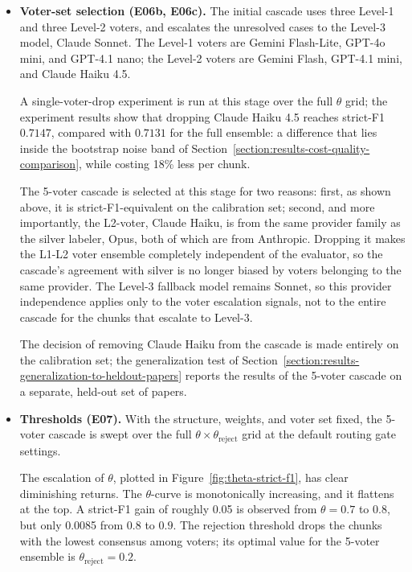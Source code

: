 \begin{itemize}[label={},leftmargin=1.5em]
    \item \textbf{Voter-set selection (E06b, E06c).}
    The initial cascade uses three Level-1 and three Level-2 voters, and escalates the unresolved cases to the Level-3 model, Claude Sonnet. The 
    Level-1 voters are Gemini Flash-Lite, GPT-4o mini, and GPT-4.1 nano; the Level-2 voters are Gemini Flash, GPT-4.1 mini, and Claude Haiku 4.5.
    
    A single-voter-drop experiment is run at this stage over the full $\theta$ grid; the experiment results show that dropping Claude Haiku 4.5 reaches strict-F1 $0.7147$, compared with $0.7131$ for the full ensemble: a difference that lies inside the bootstrap noise band of Section~\ref{section:results-cost-quality-comparison}, while costing 18\% less per chunk.
    
    The 5-voter cascade is selected at this stage for two reasons: first, as shown above, it is strict-F1-equivalent on the calibration set; second, and more importantly, the L2-voter, Claude Haiku, is from the same provider family as the silver labeler, Opus, both of which are from Anthropic. Dropping it makes the L1-L2 voter ensemble completely independent of the evaluator, so the cascade's agreement with silver is no longer biased by voters belonging to the same provider. The Level-3 fallback model remains Sonnet, so this provider independence applies only to the voter escalation signals, not to the entire cascade for the chunks that escalate to Level-3. 
    
    The decision of removing Claude Haiku from the cascade is made entirely on the calibration set; the generalization test of Section~\ref{section:results-generalization-to-heldout-papers} reports the results of the 5-voter cascade on a separate, held-out set of papers.
    
    \item \textbf{Thresholds (E07).}
    With the structure, weights, and voter set fixed, the 5-voter cascade is swept over the full $\theta \times \theta_{\mathrm{reject}}$ grid at the default routing gate settings. 
    
    The escalation of $\theta$, plotted in Figure~\ref{fig:theta-strict-f1}, has clear diminishing returns. The $\theta$-curve is monotonically increasing, and it flattens at the top. A strict-F1 gain of roughly 0.05 is observed from $\theta = 0.7$ to $0.8$, but only 0.0085 from $0.8$ to $0.9$. The rejection threshold drops the chunks with the lowest consensus among voters; its optimal value for the 5-voter ensemble is $\theta_{\mathrm{reject}} = 0.2$.


\end{itemize}
